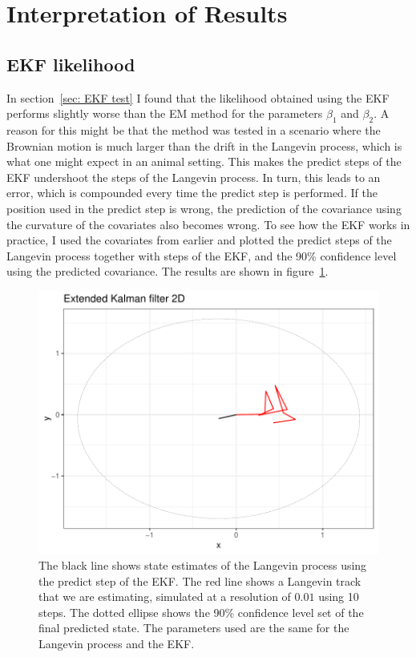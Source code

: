 

\section{Interpretation of Results}
\subsection{EKF likelihood}
 In section~\ref{sec: EKF test} I found that the likelihood obtained using the EKF performs slightly worse than the EM method for the parameters $\beta_1$ and $\beta_2$. A reason for this might be that the method was tested in a scenario where the Brownian motion is much larger than the drift in the Langevin process, which is what one might expect in an animal setting. This makes the predict steps of the EKF undershoot the steps of the Langevin process. In turn, this leads to an error, which is compounded every time the predict step is performed. If the position used in the predict step is wrong, the prediction of the covariance using the curvature of the covariates also becomes wrong. To see how the EKF works in practice, I used the covariates from earlier and plotted the predict steps of the Langevin process together with steps of the EKF, and the 90\% confidence level using the predicted covariance. The results are shown in figure~\ref{fig:EKF high diffusion}. 


\begin{figure}[H]
    \centering
    \includegraphics[width=\linewidth]{Images/discussion/EKF high diffusion path.pdf}
    \caption[EKF path]{The black line shows state estimates of the Langevin process using the predict step of the EKF. The red line shows a Langevin track that we are estimating, simulated at a resolution of $0.01$ using 10 steps. The dotted ellipse shows the 90\% confidence level set of the final predicted state. The parameters used are the same for the Langevin process and the EKF.}
    \label{fig:EKF high diffusion}
\end{figure}

